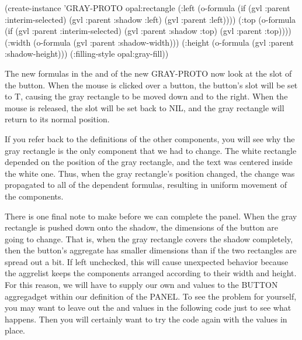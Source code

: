 \begin{programexample}
(create-instance 'GRAY-PROTO opal:rectangle
   (:left (o-formula (if (gvl :parent :interim-selected)
			 (gvl :parent :shadow :left)
			 (gvl :parent :left))))
   (:top (o-formula (if (gvl :parent :interim-selected)
			(gvl :parent :shadow :top)
			(gvl :parent :top))))
   (:width (o-formula (gvl :parent :shadow-width)))
   (:height (o-formula (gvl :parent :shadow-height)))
   (:filling-style opal:gray-fill))
\end{programexample}

The new formulas in the  and  of the new GRAY-PROTO
now look at the  slot of the button.  When the
mouse is clicked over a button, the button's 
slot will be set to T, causing the gray rectangle to be moved down and
to the right.  When the mouse is released, the 
slot will be set back to NIL, and the gray rectangle will return to
its normal position.

If you refer back to the definitions of the other components, you will
see why the gray rectangle is the only component that we had to
change.  The white rectangle depended on the position of the gray
rectangle, and the text was centered inside the white one.  Thus, when
the gray rectangle's position changed, the change was propagated to
all of the dependent formulas, resulting in uniform movement of the
components.

There is one final note to make before we can complete the panel.
When the gray rectangle is pushed down onto the shadow, the dimensions
of the button are going to change.  That is, when the gray
rectangle covers the shadow completely, then the button's aggregate has
smaller dimensions than if the two rectangles are spread out a bit.
If left unchecked, this will cause unexpected behavior because the
aggrelist keeps the components arranged according to their width and
height.  For this reason, we will have to supply our own 
and  values to the BUTTON aggregadget within our
definition of the PANEL.  To see the problem for yourself, you may
want to leave out the  and  values in the
following code just to see what happens.  Then you will certainly want
to try the code again with the values in place.

